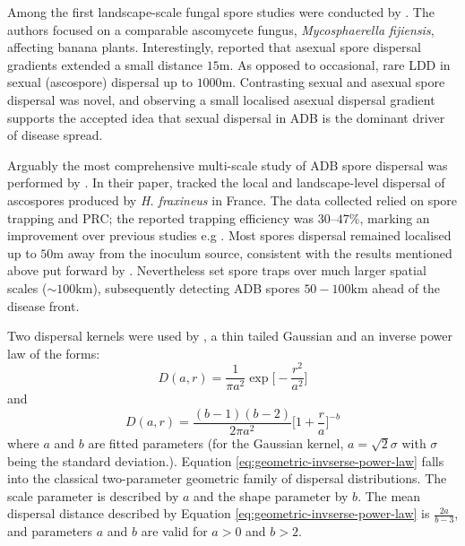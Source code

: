 Among the first landscape-scale fungal spore studies were conducted by \cite{long-range-dispersal}.
The authors focused on a comparable ascomycete fungus, \textit{Mycosphaerella fijiensis}, affecting banana plants.
Interestingly, \cite{long-range-dispersal} reported that asexual spore dispersal gradients extended 
a small distance $15\mathrm{m}$. As opposed to occasional, rare LDD in sexual (ascospore) dispersal up to $1000\mathrm{m}$.
Contrasting sexual and asexual spore dispersal was novel, and observing a small localised asexual dispersal gradient supports
the accepted idea that sexual dispersal in ADB is the dominant driver of disease spread.

Arguably the most comprehensive multi-scale study of ADB spore dispersal was performed by \cite{grosdidier2018tracking}.
In their paper, \cite{grosdidier2018tracking} tracked the local and landscape-level dispersal of ascospores
produced by \textit{H. fraxineus} in France.
The data collected relied on spore trapping and PRC; the reported trapping efficiency was $30–47\%$, marking an improvement over previous studies
e.g \cite{chandelier2014detection}. Most spores dispersal remained localised up to $50\mathrm{m}$ away from the inoculum source,
consistent with the results mentioned above put forward by \cite{chandelier2014detection}.
Nevertheless \cite{grosdidier2018tracking} set spore traps over much larger spatial scales ($\sim 100\mathrm{km}$),
subsequently detecting ADB spores $50-100\mathrm{km}$ ahead of the disease front.

Two dispersal kernels were used by \cite{grosdidier2018tracking}, a thin tailed Gaussian and an inverse 
power law of the forms:
\begin{equation}
    D(a, r) = \frac{1}{\pi a^2}\exp\big[-\frac{r^2}{a^2}\big]
    \label{eq:adb-ga}
\end{equation}
and
\begin{equation}
    D(a, r) = \frac{(b-1)(b-2)}{2\pi a^2}\big[ 1+ \frac{r}{a}\big]^{-b}
    \label{eq:geometric-invserse-power-law}
\end{equation}
where $a$ and $b$ are fitted parameters (for the Gaussian kernel, $a=\sqrt{2}\sigma$ with $\sigma$ being the standard deviation.). 
Equation \ref{eq:geometric-invserse-power-law} falls into the classical two-parameter geometric family of dispersal distributions.
The scale parameter is described by $a$ and the shape parameter by $b$. The mean dispersal distance described by Equation
\ref{eq:geometric-invserse-power-law} is  $\frac{2a}{b-3}$, and parameters $a$ and $b$ are valid for $a>0$ and $b>2$.

